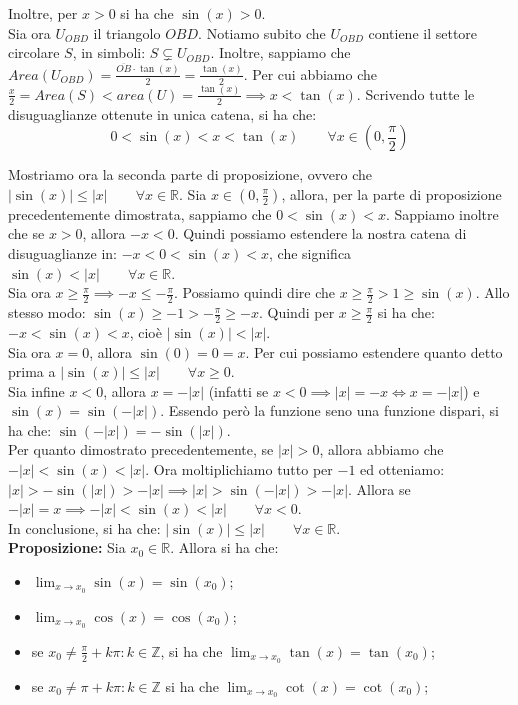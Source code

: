 \documentclass{article}
\begin{document}
\noindent Inoltre, per $x > 0$ si ha che $\sin(x) > 0$.\\
Sia ora $U_{OBD}$ il triangolo $OBD$. Notiamo subito che $U_{OBD}$ contiene il settore circolare $S$, in simboli: $S \subsetneq U_{OBD}$. Inoltre, sappiamo che $Area(U_{OBD}) = \frac{\overline{OB} \cdot \tan(x)}{2} = \frac{\tan(x)}{2}$. Per cui abbiamo che $\frac{x}{2} = Area(S) < area(U) = \frac{\tan(x)}{2} \implies x < \tan(x)$. Scrivendo tutte le disuguaglianze ottenute in unica catena, si ha che:
\begin{equation*}
    0 < \sin(x) < x < \tan(x) \qquad \forall x \in \left(0, \frac{\pi}{2}\right)
\end{equation*}

\noindent Mostriamo ora la seconda parte di proposizione, ovvero che $|\sin(x)| \leq |x| \qquad \forall x \in \mathbb{R}$. Sia $x \in (0, \frac{\pi}{2})$, allora, per la parte di proposizione precedentemente dimostrata, sappiamo che $0 < \sin(x) < x$. Sappiamo inoltre che se $x > 0$, allora $-x < 0$. Quindi possiamo estendere la nostra catena di disuguaglianze in: $-x < 0 < \sin(x) < x$, che significa $\sin(x) < |x| \qquad \forall x \in \mathbb{R}$.\\
Sia ora $x \geq \frac{\pi}{2} \implies -x \leq -\frac{\pi}{2}$. Possiamo quindi dire che $x \geq \frac{\pi}{2} > 1 \geq \sin(x)$. Allo stesso modo: $\sin(x) \geq -1 > -\frac{\pi}{2} \geq -x$. Quindi per $x \geq \frac{\pi}{2}$ si ha che: $-x < \sin(x) < x$, cioè $|\sin(x)| < |x|$.\\
Sia ora $x = 0$, allora $\sin(0) = 0 = x$. Per cui possiamo estendere quanto detto prima a $|\sin(x)| \leq |x| \qquad \forall x \geq 0$.\\
Sia infine $x < 0$, allora $x = -|x|$ (infatti se $x < 0 \implies |x| = -x \iff x = -|x|$) e $\sin(x) = \sin(-|x|)$. Essendo però la funzione seno una funzione dispari, si ha che: $\sin(-|x|) = -\sin(|x|)$.\\
Per quanto dimostrato precedentemente, se $|x| > 0$, allora abbiamo che $-|x| < \sin(x) < |x|$. Ora moltiplichiamo tutto per $-1$ ed otteniamo: $|x| > -\sin(|x|) > -|x| \implies |x| > \sin(-|x|) > -|x|$. Allora se $-|x| = x \implies -|x| < \sin(x) < |x| \qquad \forall x < 0$.\\
In conclusione, si ha che: $|\sin(x)| \leq |x| \qquad \forall x \in \mathbb{R}$.\\

\noindent\textbf{Proposizione:} Sia $x_0 \in \mathbb{R}$. Allora si ha che:
\begin{itemize}
    \item $\lim_{x \to x_0} \sin(x) = \sin(x_0)$;
    \item $\lim_{x \to x_0} \cos(x) = \cos(x_0)$;
    \item se $x_0 \neq \frac{\pi}{2} + k\pi : k \in \mathbb{Z}$, si ha che $\lim_{x \to x_0} \tan(x) = \tan(x_0)$;
    \item se $x_0 \neq \pi + k\pi : k \in \mathbb{Z}$ si ha che $\lim_{x \to x_0} \cot(x) = \cot(x_0)$;
\end{itemize}
\end{document}
